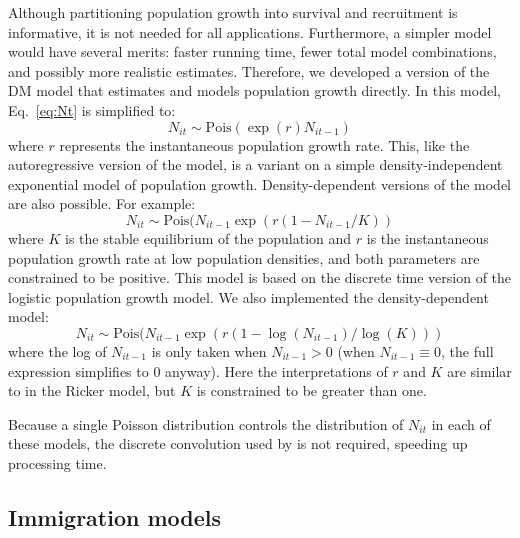 \documentclass[12pt]{article}
\begin{document}
Although partitioning population growth into survival and recruitment
is informative, it is not needed for all applications.  Furthermore, a
simpler model would have several merits: faster running time, fewer
total model combinations, and possibly more realistic estimates.
Therefore, we developed a version of the DM model that estimates and
models population growth directly.  In this model, Eq.~\ref{eq:Nt} is
simplified to:
\begin{equation}
  N_{it} \sim \text{Pois}(\exp(r)N_{it-1})
\label{eq:exp}
\end{equation}
where $r$ represents the instantaneous population growth rate.  This,
like the autoregressive version of the model, is a variant on a simple
density-independent exponential model of population growth.
Density-dependent versions of the model are also possible.  For
example:
\begin{equation}
  N_{it} \sim \text{Pois}(N_{it-1}\exp(r(1-N_{it-1}/K))
\label{eq:rick}
\end{equation}
where $K$ is the stable equilibrium of the population and $r$ is the
instantaneous population growth rate at low population densities, and
both parameters are constrained to be positive.  This model is based
on the \citet{ricker:1954} discrete time version of the logistic population
growth model.  We also implemented the \citet{gompertz:1825} density-dependent
model:
\begin{equation}
  N_{it} \sim \text{Pois}(N_{it-1}\exp(r(1-\log(N_{it-1})/\log(K)))
\label{eq:gomp}
\end{equation}
where the log of $N_{it-1}$ is only taken when $N_{it-1}>0$
(when $N_{it-1} \equiv 0$, the full expression simplifies to 0 anyway).  Here
the interpretations of $r$ and $K$ are similar to in the Ricker model, but
$K$ is constrained to be greater than one.

Because a single Poisson distribution controls the
distribution of $N_{it}$ in each of these models, the discrete
convolution used by \citet{dail_madsen:2011} is not required,
speeding up processing time.

\subsection{Immigration models}
\end{document}
